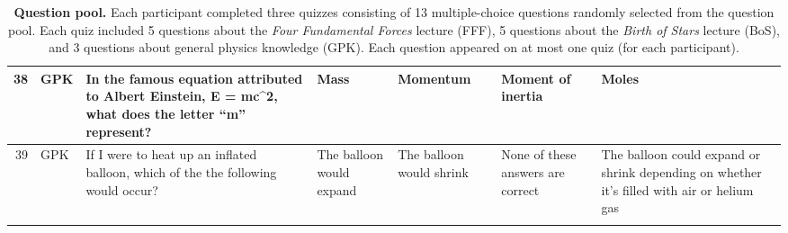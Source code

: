 \documentclass[10pt]{article}
\begin{document}
\begin{tiny}
\begin{longtable}{|r|p{0.375in}|p{1.275in}|p{0.75in}|p{0.75in}|p{0.75in}|p{0.75in}|}
    38    &      GPK &                                                                                                                                                                              In the famous equation attributed to Albert Einstein, E = mc\textasciicircum 2, what does the letter ``m'' represent? &                                                                                                                                  Mass &                                                                                              Momentum &                                                                                                          Moment of inertia &                                                                                                                             Moles \\\hline
    39    &      GPK &                                                                                                                                                                                                If I were to heat up an inflated balloon, which of the the following would occur? &                                                                                                              The balloon would expand &                                                                              The balloon would shrink &                                                                                          None of these answers are correct &                                        The balloon could expand or shrink depending on whether it's filled with air or helium gas \\\hline

    \caption{\textbf{Question pool.} Each participant completed three quizzes consisting 
    of 13 multiple-choice questions randomly selected from the question pool. Each 
    quiz included 5 questions about the \textit{Four Fundamental Forces} lecture 
    (FFF), 5 questions about the \textit{Birth of Stars} lecture (BoS), and 3 questions 
    about general physics knowledge (GPK). Each question appeared on at most 
    one quiz (for each participant).}

    \label{tab:questions}
    \end{longtable}
\end{tiny}
\end{document}
